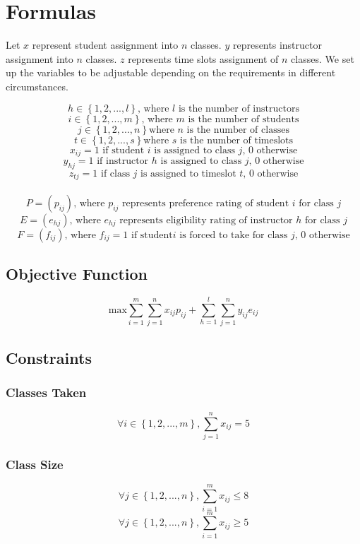 \documentclass[11pt]{article}
\begin{document}
\section{Formulas}
\indent Let $x$ represent student assignment into $n$ classes. $y$ represents instructor assignment into $n$ classes. $z$ represents time slots assignment of $n$ classes. We set up the variables to be adjustable depending on the requirements in different circumstances. 
\hspace*{-20cm}
\begin{Large}
\[h \in \left\{ {1,2,...,l}\right\}\text{, where 
}l \text{ is the number of instructors}\]
\[i \in \left\{ {1,2,...,m}\right\}\text{, where 
}m \text{ is the number of students}\]
\[j \in \left\{{1,2,...,n}\right\} \text{where } n \text{ is the number of classes} \]
\[t \in \left\{{1,2,...,s}\right\} \text{where } s \text{ is the number of timeslots} \]
\[x_{ij} = 1 \text{ if student } i \text{ is assigned to class }j \text{, 0 otherwise}\]
\[y_{hj} = 1 \text{ if instructor } h  \text{ is assigned to class }j \text{, 0 otherwise}\]
\[z_{tj} = 1 \text{ if class } j  \text{ is assigned to timeslot }t \text{, 0 otherwise}\]\\


\[P =(p_{ij}) \text{, where } p_{ij} \text{ represents preference rating of student } i \text{ for class }j\]
\[E =(e_{hj}) \text{, where } e_{hj} \text{ represents eligibility rating of instructor } h \text{ for class }j\]
\[F =(f_{ij}) \text{, where } f_{ij} = 1 \text{ if student} i \text{ is forced to take for class }j \text{, 0 otherwise}\]

\end{Large}
\subsection{Objective Function}
\Huge
\[\text{max} \sum_{i=1}^{m} \sum_{j=1}^{n}x_{ij}p_{ij} + \sum_{h=1}^{l}\sum_{j=1}^{n}y_{ij}e_{ij}\]
\subsection{Constraints}
\subsubsection{Classes Taken}
\[\forall i \in \left\{ {1,2,...,m}\right\},\sum_{j=1}^{n}x_{ij} = 5\]
\subsubsection{Class Size}
\[\forall j \in \left\{ {1,2,...,n}\right\},\sum_{i=1}^{m}x_{ij} \leq 8\]
\[\forall j \in \left\{ {1,2,...,n}\right\},\sum_{i=1}^{m}x_{ij} \geq 5\]
\end{document}
